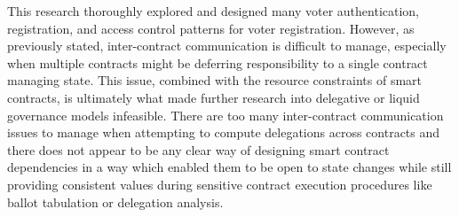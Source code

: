 This research thoroughly explored and designed many voter authentication,
registration, and access control patterns for voter registration. However, as
previously stated, inter-contract communication is difficult to manage,
especially when multiple contracts might be deferring responsibility to a single
contract managing state. This issue, combined with the resource constraints of
smart contracts, is ultimately what made further research into delegative or
liquid governance models infeasible. There are too many inter-contract
communication issues to manage when attempting to compute delegations across
contracts and there does not appear to be any clear way of designing smart
contract dependencies in a way which enabled them to be open to state changes
while still providing consistent values during sensitive contract execution
procedures like ballot tabulation or delegation analysis.

